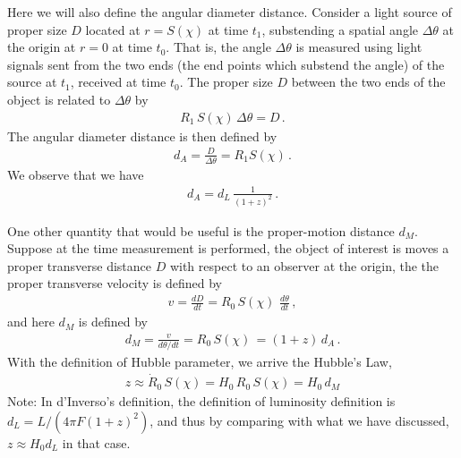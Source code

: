 \documentclass[11pt, onesided]{book}
\theoremstyle{break}
\theoremstyle{break}
\newcommand{\note}{\color{red}Note: \color{black}}
\begin{document}
Here we will also define the angular diameter distance. Consider a light source of proper size $D$ located at $r=S(\chi)$ at time $t_1$, substending a spatial angle $\Delta \theta$ at the origin at $r= 0$ at time $t_0$. That is, the angle $\Delta \theta$ is measured using light signals sent from the two ends (the end points which substend the angle) of the source at $t_1$, received at time $t_0$. The proper size $D$ between the two ends of the object is related to $\Delta \theta$ by
\begin{align*}
R_1\, S(\chi)\,\Delta \theta = D\,.
\end{align*} 
The angular diameter distance is then defined by
\begin{align*}
d_A = \frac{D}{\Delta \theta} = R_1 S(\chi)\,.
\end{align*}
We observe that we have
\begin{align*}
d_A = d_L \, \frac{1}{(1+z)^2}\,.
\end{align*}

One other quantity that would be useful is the proper-motion distance $d_M$. Suppose at the time measurement is performed, the object of interest is moves a proper transverse distance $D$ with respect to an observer at the origin, the the proper transverse velocity is defined by
\begin{align*}
v = \frac{dD}{dt} = R_0\, S(\chi)\,\, \frac{d\theta}{dt}\,,
\end{align*}
and here $d_M$ is defined by
\begin{align*}
d_M = \frac{v}{d\theta/dt} = R_0\, S(\chi) \, = (1+z)\, d_A\,.
\end{align*}
With the definition of Hubble parameter, we arrive the Hubble's Law,
\begin{align*}
z \approx \dot{R}_0\, S(\chi) = H_0 \, R_0 \, S(\chi) = H_0 \, d_M
\end{align*}
\note In d'Inverso's definition, the definition of luminosity definition is $d_L = L/(4\pi F (1+z)^2)$, and thus by comparing with what we have discussed, $z\approx H_0 d_L$ in that case.
\end{document}
